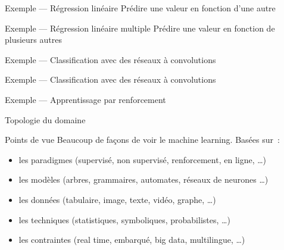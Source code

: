 \begin{frame}{Exemple --- Régression linéaire}
  Prédire une valeur en fonction d'une autre

\end{frame}

\begin{frame}{Exemple --- Régression linéaire multiple}
  Prédire une valeur en fonction de plusieurs autres

\end{frame}

\begin{frame}{Exemple --- Classification avec des réseaux à convolutions}
\end{frame}

\begin{frame}{Exemple --- Classification avec des réseaux à convolutions}
\end{frame}

\begin{frame}{Exemple --- Apprentissage par renforcement}
\end{frame}

\begin{frame}{Topologie du domaine}
\end{frame}

\begin{frame}{Points de vue}
  Beaucoup de façons de voir le machine learning. Basées sur :
  \begin{itemize}[<+->]
  \item les paradigmes (supervisé, non supervisé, renforcement, en
    ligne, …)
  \item les modèles (arbres, grammaires, automates, réseaux de
    neurones …)
  \item les données (tabulaire, image, texte, vidéo, graphe, …)
  \item les techniques (statistiques, symboliques, probabilistes, …)
  \item les contraintes (real time, embarqué, big data, multilingue,
    …)
  \end{itemize}

\end{frame}

